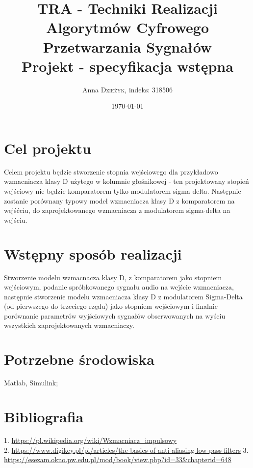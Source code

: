 \documentclass{article}
\title{TRA - Techniki Realizacji Algorytmów Cyfrowego Przetwarzania Sygnałów  \\ Projekt - specyfikacja wstępna \\} %
\author{Anna \textsc{Dzieżyk}, indeks: 318506 \\ }%
\date{\today} %
\begin{document}
\maketitle %
\section{Cel projektu}
Celem projektu będzie stworzenie stopnia wejściowego dla przykładowo wzmacniacza klasy D użytego w kolumnie głośnikowej -  
ten projektowany stopień wejściowy nie będzie komparatorem tylko modulatorem sigma delta. Następnie zostanie porównany typowy model 
wzmacniacza klasy D z komparatorem na wejśćciu, do zaprojektowanego wzmacniacza z modulatorem sigma-delta na wejściu.
\section{Wstępny sposób realizacji}

Stworzenie modelu wzmacnacza klasy D, z komparatorem jako stopniem wejściowym, podanie spróbkowanego sygnału audio na wejście wzmacniacza, następnie stworzenie modelu 
wzmacniacza klasy D z modulatorem Sigma-Delta (od pierwszego do trzeciego rzędu) jako stopniem wejściowym i finalnie porównanie parametrów wyjściowych sygnałów obserwowanych na wyściu wszystkich zaprojektowanych wzmacniaczy.
\section{Potrzebne środowiska}
Matlab, Simulink;
\section{Bibliografia}
1. \url{https://pl.wikipedia.org/wiki/Wzmacniacz_impulsowy} \\
2. \url{https://www.digikey.pl/pl/articles/the-basics-of-anti-aliasing-low-pass-filters}
3. \url{https://esezam.okno.pw.edu.pl/mod/book/view.php?id=33&chapterid=648}
\end{document}
